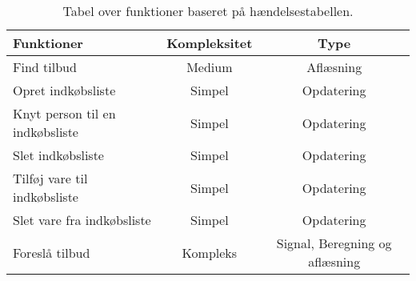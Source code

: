 \begin{table}[H]
\centering
    \begin{tabular}{|l|c|c|}
        \hline
    Funktioner                                          & Kompleksitet & Type        \\ \hline
	Find tilbud                                         & Medium       & Aflæsning   \\ \hline
	Opret indkøbsliste                                  & Simpel       & Opdatering  \\ \hline
	Knyt person til en indkøbsliste                     & Simpel       & Opdatering  \\ \hline
	Slet indkøbsliste                                   & Simpel       & Opdatering  \\ \hline
	Tilføj vare til indkøbsliste                        & Simpel       & Opdatering  \\ \hline
	Slet vare fra indkøbsliste                          & Simpel       & Opdatering  \\ \hline
	Foreslå tilbud                                      & Kompleks     & Signal, Beregning og aflæsning    \\ \hline
    \end{tabular}
\caption{Tabel over funktioner baseret på hændelsestabellen.}
\label{tab:funktionstabel}

\end{table}